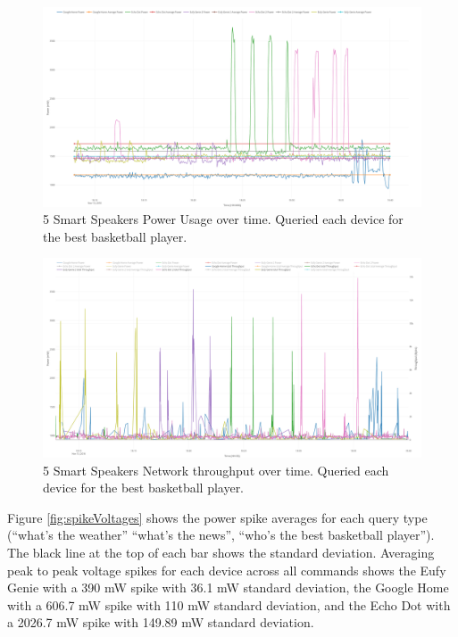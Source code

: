 \begin{figure}[H]
  \centering
  \includegraphics[width=1\textwidth]{figures/bestBballSeperate.png}
  \caption{5 Smart Speakers Power Usage over time. Queried each device for the
  best basketball player.}
  \label{fig:bestBballSeperate}
\end{figure}

\begin{figure}[H]
  \centering
  \includegraphics[width=1\textwidth]{figures/bestBballNetwork.png}
  \caption{5 Smart Speakers Network throughput over time. Queried each device for the best basketball player.}
  \label{fig:bestBballNetwork}
\end{figure}

Figure \ref{fig:spikeVoltages} shows the power spike averages for each query type (``what's the weather'' ``what's the news'', ``who's the best basketball player''). The black line at the top of each bar shows the standard deviation. Averaging peak to peak voltage spikes for each device across all commands shows the Eufy Genie with a 390 mW spike with 36.1 mW standard deviation, the Google Home with a 606.7 mW spike with 110 mW standard deviation, and the Echo Dot with a 2026.7 mW spike with 149.89 mW standard deviation.

